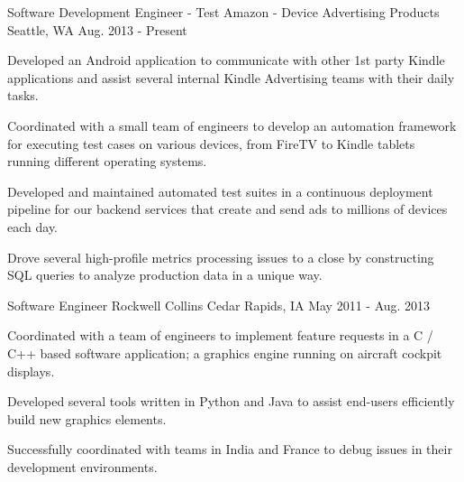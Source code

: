 

\begin{cventries}

  \cventry
    {Software Development Engineer - Test} %
    {Amazon - Device Advertising Products} %
    {Seattle, WA} %
    {Aug. 2013 - Present} %
    {
      \begin{cvitems} %
        \item {Developed an Android application to communicate with other 1st party Kindle applications and assist several internal Kindle Advertising teams with their daily tasks.}
        \item {Coordinated with a small team of engineers to develop an automation framework for executing test cases on various devices, from FireTV to Kindle tablets running different operating systems.}
        \item {Developed and maintained automated test suites in a continuous deployment pipeline for our backend services that create and send ads to millions of devices each day.}
        \item {Drove several high-profile metrics processing issues to a close by constructing SQL queries to analyze production data in a unique way.}
      \end{cvitems}
    }

  \cventry
    {Software Engineer} %
    {Rockwell Collins} %
    {Cedar Rapids, IA} %
    {May 2011 - Aug. 2013} %
    {
      \begin{cvitems} %
        \item {Coordinated with a team of engineers to implement feature requests in a C / C++ based software application; a graphics engine running on aircraft cockpit displays.}
        \item {Developed several tools written in Python and Java to assist end-users efficiently build new graphics elements.}
        \item {Successfully coordinated with teams in India and France to debug issues in their development environments.}
      \end{cvitems}
    }

\end{cventries}
